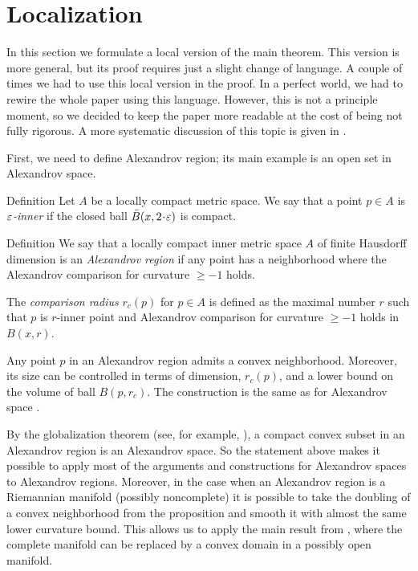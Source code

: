 \section{Localization}\label{sec:local}

In this section we formulate a local version of the main theorem.
This version is more general, but its proof requires just a slight change of language.
A couple of times we had to use this local version in the proof.
In a perfect world, we had to rewire the whole paper using this language.
However, this is not a principle moment,
so we decided to keep the paper more readable at the cost of being not fully rigorous.
A more systematic discussion of this topic is given in \cite{LNep}.

First, we need to define Alexandrov region;
its main example is an open set in Alexandrov space.

\begin{thm}{Definition}
Let $A$ be a locally compact metric space. 
We say that a point  $p\in A$
is \emph{$\varepsilon$-inner} if
the closed ball $\bar B(x,2\cdot\eps)$ is compact.
\end{thm}

\begin{thm}{Definition}
We say that a locally compact inner metric space $A$ of finite Hausdorff dimension is an \emph{Alexandrov region} if any point has a neighborhood where the Alexandrov comparison for curvature $\ge -1$ holds.

The \emph{comparison radius} $r_c(p)$ for $p\in A$ is defined as the maximal number $r$ such that $p$ is $r$-inner point and Alexandrov comparison for curvature $\ge -1$ holds in $B(x,r)$.
\end{thm}

Any point $p$ in an Alexandrov region admits a convex neighborhood.
Moreover, its size can be controlled in terms of dimension, $r_c(p)$, and a lower bound on the volume of ball $B(p,r_c)$.
The construction is the same as for Alexandrov space \cite[4.3]{perelman-petrunin}.

By the globalization theorem (see, for example, \cite{AKP}), a compact convex subset in an Alexandrov region is an Alexandrov space.
So the statement above makes it possible to apply most of the arguments and constructions for Alexandrov spaces to Alexandrov regions. 
Moreover, in the case when an Alexandrov region is a Riemannian manifold (possibly noncomplete) it is possible to take the doubling of a convex neighborhood from the proposition and smooth it with almost the same lower curvature bound.
This allows us to apply the main result from \cite{petrunin-SC}, where the complete manifold can be replaced by a convex domain in a possibly open manifold. 


